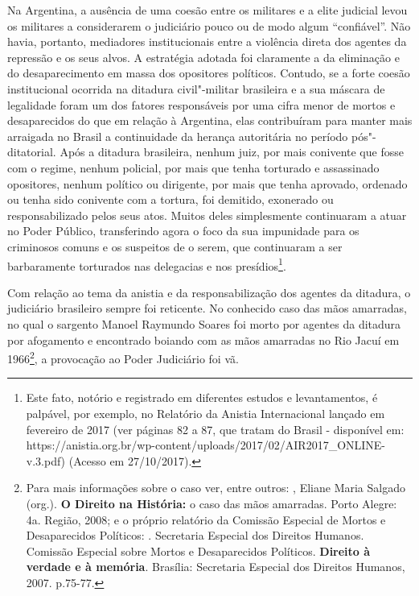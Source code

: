 Na Argentina, a ausência de uma coesão entre os militares e a elite
judicial levou os militares a considerarem o judiciário pouco ou de modo
algum ``confiável''. Não havia, portanto, mediadores institucionais
entre a violência direta dos agentes da repressão e os seus alvos. A
estratégia adotada foi claramente a da eliminação e do desaparecimento
em massa dos opositores políticos. Contudo, se a forte coesão
institucional ocorrida na ditadura civil"-militar brasileira e a sua
máscara de legalidade foram um dos fatores responsáveis por uma cifra
menor de mortos e desaparecidos do que em relação à Argentina, elas
contribuíram para manter mais arraigada no Brasil a continuidade da
herança autoritária no período pós"-ditatorial. Após a ditadura
brasileira, nenhum juiz, por mais conivente que fosse com o regime,
nenhum policial, por mais que tenha torturado e assassinado opositores,
nenhum político ou dirigente, por mais que tenha aprovado, ordenado ou
tenha sido conivente com a tortura, foi demitido, exonerado ou
responsabilizado pelos seus atos. Muitos deles simplesmente continuaram
a atuar no Poder Público, transferindo agora o foco da sua impunidade
para os criminosos comuns e os suspeitos de o serem, que continuaram a
ser barbaramente torturados nas delegacias e nos presídios\footnote{Este
  fato, notório e registrado em diferentes estudos e levantamentos, é
  palpável, por exemplo, no Relatório da Anistia Internacional lançado
  em fevereiro de 2017 (ver páginas 82 a 87, que tratam do Brasil -
  disponível em:
  https://anistia.org.br/wp-content/uploads/2017/02/AIR2017\_ONLINE-v.3.pdf)
  (Acesso em 27/10/2017).}.

Com relação ao tema da anistia e da responsabilização dos agentes da
ditadura, o judiciário brasileiro sempre foi reticente. No conhecido
caso das mãos amarradas, no qual o sargento Manoel Raymundo Soares foi
morto por agentes da ditadura por afogamento e encontrado boiando com as
mãos amarradas no Rio Jacuí em 1966\footnote{Para mais informações sobre
  o caso ver, entre outros: , Eliane Maria Salgado (org.).
  \textbf{O Direito na História:} o caso das mãos amarradas. Porto
  Alegre:  4a. Região, 2008; e o próprio relatório da Comissão
  Especial de Mortos e Desaparecidos Políticos: . Secretaria
  Especial dos Direitos Humanos. Comissão Especial sobre Mortos e
  Desaparecidos Políticos. \textbf{Direito à verdade e à memória}.
  Brasília: Secretaria Especial dos Direitos Humanos, 2007. p.75-77.}, a
provocação ao Poder Judiciário foi vã.

